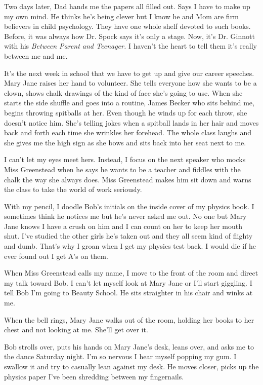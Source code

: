 \documentclass[twoside,10pt]{book}
\begin{document}
Two days later, Dad hands me the papers all filled out. Says I have to
make up my own mind. He thinks he's being clever but I know he and Mom
are firm believers in child psychology. They have one whole shelf
devoted to such books. Before, it was always how Dr. Spock says it's
only a stage. Now, it's Dr. Ginnott with his \emph{Between Parent and
Teenager.} I haven't the heart to tell them it's really between me and
me.

It's the next week in school that we have to get up and give our career
speeches. Mary Jane raises her hand to volunteer. She tells everyone how
she wants to be a clown, shows chalk drawings of the kind of face she's
going to use. When she starts the side shuffle and goes into a routine,
James Becker who sits behind me, begins throwing spitballs at her. Even
though he winds up for each throw, she doesn't notice him. She's telling
jokes when a spitball lands in her hair and moves back and forth each
time she wrinkles her forehead. The whole class laughs and she gives me
the high sign as she bows and sits back into her seat next to me.

I can't let my eyes meet hers. Instead, I focus on the next speaker who
mocks Miss Greenstead when he says he wants to be a teacher and fiddles
with the chalk the way she always does. Miss Green­stead makes him sit
down and warns the class to take the world of work seriously.

With my pencil, I doodle Bob's initials on the inside cover of my
physics book. I sometimes think he notices me but he's never asked me
out. No one but Mary Jane knows I have a crush on him and I can count on
her to keep her mouth shut. I've studied the other girls he's taken out
and they all seem kind of flighty and dumb. That's why I groan when I
get my physics test back. I would die if he ever found out I get A's on
them.

When Miss Greenstead calls my name, I move to the front of the room and
direct my talk toward Bob. I can't let myself look at Mary Jane or I'll
start giggling. I tell Bob I'm going to Beauty School. He sits
straighter in his chair and winks at me.

When the bell rings, Mary Jane walks out of the room, holding her books
to her chest and not looking at me. She'll get over it.

Bob strolls over, puts his hands on Mary Jane's desk, leans over, and
asks me to the dance Saturday night. I'm so nervous I hear myself
popping my gum. I swallow it and try to casually lean against my desk.
He moves closer, picks up the physics paper I've been shredding between
my fingernails.
\end{document}
